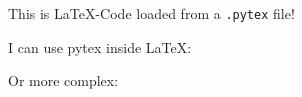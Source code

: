 \vspace{1em}

This is \LaTeX-Code loaded from a \texttt{.pytex} file!

I can use pytex inside \LaTeX: %

Or more complex: %
